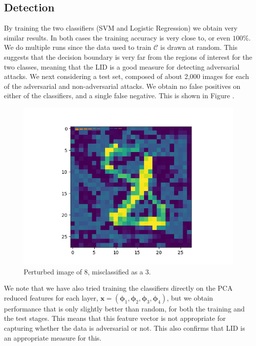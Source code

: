 \subsection{Detection}

By training the two classifiers (SVM and Logistic Regression) we obtain very similar results. In both cases the training accuracy is very close to, or even $100\%$. We do multiple runs since the data used to train $\mathcal{C}$ is drawn at random. This suggests that the decision boundary is very far from the regions of interest for the two classes, meaning that the LID is a good measure for detecting adversarial attacks. We next considering a test set, composed of about 2,000 images for each of the adversarial and non-adversarial attacks. We obtain no false positives on either of the classifiers, and a single false negative. This is shown in Figure .
\begin{figure}
\centering
\includegraphics[scale=0.8]{eightthree.png}
\caption{Perturbed image of 8, misclassified as a 3.}
\end{figure}
We note that we have also tried training the classifiers directly on the PCA reduced features for each layer, $\mathbf{x} =(\boldsymbol{\phi}_1,\boldsymbol{\phi}_2,\boldsymbol{\phi}_3,\boldsymbol{\phi}_4)$, but we obtain performance that is only slightly better than random, for both the training and the test stages. This means that this feature vector is not appropriate for capturing whether the data is adversarial or not. This also confirms that LID is an appropriate measure for this.
